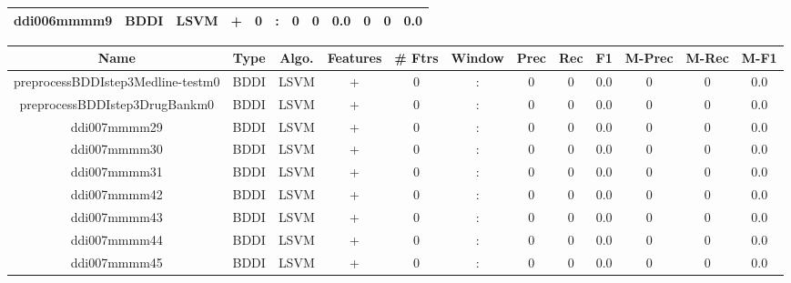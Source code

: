 \documentclass[a4paper]{article}
\begin{document}
\begin{landscape}
\begin{center}
\begin{tabular}{ |c|c|c|c|c|c|c|c|c|c|c|c|}
 
 	
 	\small{ ddi006mmmm9 } & BDDI & LSVM & +  &  0 &  :  &  0 & 0 & 0.0  &  0 & 0 & 0.0 \\
 	
 \hline
\end{tabular}
\end{center}




\begin{center}
\begin{tabular}{ |c|c|c|c|c|c|c|c|c|c|c|c|} 
 \hline
 	Name & Type & Algo. & Features & \# Ftrs & Window & Prec & Rec & F1 & M-Prec & M-Rec & M-F1\\
 \hline

 	

 
 	
 	\small{ preprocessBDDIstep3Medline-testm0 } & BDDI & LSVM & +  &  0 &  :  &  0 & 0 & 0.0  &  0 & 0 & 0.0 \\
 	

 
 	
 	\small{ preprocessBDDIstep3DrugBankm0 } & BDDI & LSVM & +  &  0 &  :  &  0 & 0 & 0.0  &  0 & 0 & 0.0 \\
 	

 
 	
 	\small{ ddi007mmmm29 } & BDDI & LSVM & +  &  0 &  :  &  0 & 0 & 0.0  &  0 & 0 & 0.0 \\
 	

 
 	
 	\small{ ddi007mmmm30 } & BDDI & LSVM & +  &  0 &  :  &  0 & 0 & 0.0  &  0 & 0 & 0.0 \\
 	

 
 	
 	\small{ ddi007mmmm31 } & BDDI & LSVM & +  &  0 &  :  &  0 & 0 & 0.0  &  0 & 0 & 0.0 \\
 	

 
 	
 	\small{ ddi007mmmm42 } & BDDI & LSVM & +  &  0 &  :  &  0 & 0 & 0.0  &  0 & 0 & 0.0 \\
 	

 
 	
 	\small{ ddi007mmmm43 } & BDDI & LSVM & +  &  0 &  :  &  0 & 0 & 0.0  &  0 & 0 & 0.0 \\
 	

 
 	
 	\small{ ddi007mmmm44 } & BDDI & LSVM & +  &  0 &  :  &  0 & 0 & 0.0  &  0 & 0 & 0.0 \\
 	

 
 	
 	\small{ ddi007mmmm45 } & BDDI & LSVM & +  &  0 &  :  &  0 & 0 & 0.0  &  0 & 0 & 0.0 \\
 	


\end{tabular}
\end{center}
\end{landscape}
\end{document}
